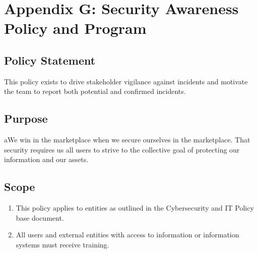 \documentclass[../main.tex]{subfiles}
\begin{document}
\section{Appendix G: Security Awareness Policy and Program}
\subsection{Policy Statement}
This policy exists to drive stakeholder vigilance against incidents and motivate the team to report both potential and confirmed incidents.
\subsection{Purpose}
aWe win in the marketplace when we secure ourselves in the marketplace. That security requires us all users to strive to the collective goal of protecting our information and our assets.
\subsection{Scope}
\begin{enumerate}
    \item This policy applies to entities as outlined in the Cybersecurity and IT Policy base document.
    \item All \CompanyName users and external entities with access to \CompanyName information or information systems must receive training.
\end{enumerate}
\end{document}
